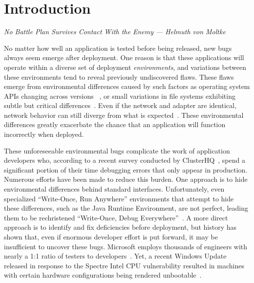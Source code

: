 \section{Introduction}
\label{SEC:introduction}
\textit{No Battle Plan Survives Contact With the Enemy --- Helmuth von Moltke}

No matter how well an application is tested before being released,
new bugs always seem emerge after deployment.
One reason is that these applications will operate within a diverse set of
deployment \emph{environments},
and variations between these environments tend to
reveal previously undiscovered flaws.
These flaws emerge from environmental differences
caused by such factors as
operating system APIs changing across versions
~\cite{LinuxGlibcChanges},
or small variations in file systems exhibiting subtle but critical
differences~\cite{EXT4Layout, AppleHFS}.
Even if the network and adapter are identical,
network behavior can still diverge from what is expected~\cite{vbox}.
These environmental differences greatly exacerbate
the chance that an application will function incorrectly when deployed.

These unforeseeable environmental bugs
complicate the work of application developers who, according to a
recent survey conducted by ClusterHQ~\cite{ClusterHQSurvey},
spend a significant portion of their time
debugging errors that only appear in production.
Numerous efforts have been made to reduce this burden.
One approach
is to hide environmental differences behind standard interfaces.
Unfortunately,
even specialized ``Write-Once, Run Anywhere'' environments
that attempt to hide these differences,
such as the Java Runtime Environment,
are not perfect,
leading them to be rechristened ``Write-Once, Debug Everywhere''~\cite{WODE}.
A more direct approach is
to identify and fix deficiencies before deployment,
but history has shown that,
even if enormous developer effort is put forward,
it may be insufficient to uncover these bugs.
Microsoft employs thousands of engineers with nearly a
1:1 ratio of testers to developers~\cite{Page2009}.
Yet, a recent Windows Update released
in response to the Spectre Intel CPU vulnerability
resulted in machines with certain hardware configurations
being rendered unbootable~\cite{kb4056892}.


